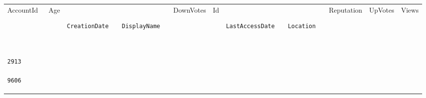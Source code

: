\documentclass[12pt,a4paper,twoside,openright,titlepage,final]{article}
\begin{document}
\begin{enumerate}
	\begin{longtable}[]{@{}lllllllllll@{}}
		\label{tbl:mas_edad}\\
		\toprule
		\begin{minipage}[t]{0.05\columnwidth}\raggedright\strut
			AccountId
			\strut\end{minipage} &
		\begin{minipage}[t]{0.02\columnwidth}\raggedright\strut
			Age
			\strut\end{minipage} &
		\begin{minipage}[t]{0.11\columnwidth}\raggedright\strut
			\begin{verbatim}
			CreationDate
			\end{verbatim}
			\strut\end{minipage} &
		\begin{minipage}[t]{0.09\columnwidth}\raggedright\strut
			\begin{verbatim}
			DisplayName
			\end{verbatim}
			\strut\end{minipage} &
		\begin{minipage}[t]{0.05\columnwidth}\raggedright\strut
			DownVotes
			\strut\end{minipage} &
		\begin{minipage}[t]{0.03\columnwidth}\raggedright\strut
			Id
			\strut\end{minipage} &
		\begin{minipage}[t]{0.11\columnwidth}\raggedright\strut
			\begin{verbatim}
			LastAccessDate
			\end{verbatim}
			\strut\end{minipage} &
		\begin{minipage}[t]{0.11\columnwidth}\raggedright\strut
			\begin{verbatim}
			Location
			\end{verbatim}
			\strut\end{minipage} &
		\begin{minipage}[t]{0.06\columnwidth}\raggedright\strut
			Reputation
			\strut\end{minipage} &
		\begin{minipage}[t]{0.04\columnwidth}\raggedright\strut
			UpVotes
			\strut\end{minipage} &
		\begin{minipage}[t]{0.04\columnwidth}\raggedright\strut
			Views
			\strut\end{minipage}\tabularnewline
		\begin{minipage}[t]{0.05\columnwidth}\raggedright\strut
			\begin{verbatim}
			2913
			9606
			\end{verbatim}
			

\end{minipage}
\end{longtable}
\end{enumerate}
\end{document}
